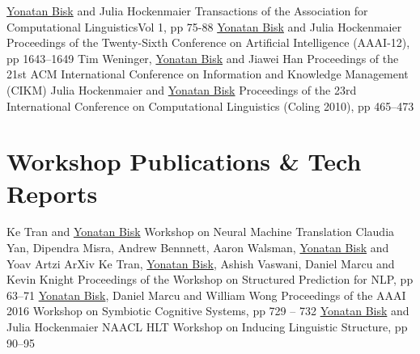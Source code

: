 \documentclass[10pt,letter]{moderncv}
\newcommand{\YB}{\underline{Yonatan Bisk}}
\begin{document}
  {\href{http://yonatanbisk.com/papers/2013-TACL.pdf}{\color{linkcolor}{An HDP Model for Inducing Combinatory Categorial Grammars}}}
  {\YB{} and Julia Hockenmaier}
  {Transactions of the Association for Computational Linguistics}{Vol 1, pp 75-88}{}
  {\href{http://yonatanbisk.com/papers/2012-AAAI.pdf}{\color{linkcolor}{Simple Robust Grammar Induction with Combinatory Categorial Grammars}}}
  {\YB{} and Julia Hockenmaier}
  {Proceedings of the Twenty-Sixth Conference on Artificial Intelligence (AAAI-12), pp 1643--1649}{}{}
\pub{--}
  {\href{http://yonatanbisk.com/papers/2012-CIKM.pdf}{\color{linkcolor}{Document-Topic Hierarchies from Document Graphs}}}
  {Tim Weninger, \YB{} and Jiawei Han}
  {Proceedings of the 21st ACM International Conference on Information and Knowledge Management (CIKM)}{}{}
  {\href{http://yonatanbisk.com/papers/2010-COLING.pdf}{\color{linkcolor}{Normal-form parsing for Combinatory Categorial Grammars with generalized composition and type-raising}}}
  {Julia Hockenmaier and \YB{}}
  {Proceedings of the 23rd International Conference on Computational Linguistics (Coling 2010), pp 465--473}{}{}


\section{Workshop Publications \& Tech Reports}
  {\href{https://arxiv.org/abs/1805.10850}{\color{linkcolor}{Inducing Grammars with and for Neural Machine Translation}}}
  {Ke Tran and \YB{}}
  {Workshop on Neural Machine Translation}{}{}
\pub{--}
  {\href{https://arxiv.org/abs/1801.07357}{\color{linkcolor}{CHALET: Cornell House Agent Learning Environment}}}
  {Claudia Yan, Dipendra Misra, Andrew Bennnett, Aaron Walsman, \YB{} and Yoav Artzi}
  {ArXiv}{}{}
  {\href{http://yonatanbisk.com/papers/2016-EMNLP-StrcPred.pdf}{\color{linkcolor}{Unsupervised Neural Hidden Markov Models}}}
  {Ke Tran, \YB{}, Ashish Vaswani, Daniel Marcu and Kevin Knight}
  {Proceedings of the Workshop on Structured Prediction for NLP, pp 63--71}{}{}
\pub{--}
  {\href{http://yonatanbisk.com/papers/2016-AAAI-Wksp.pdf}{\color{linkcolor}{Towards a Dataset for Human Computer Communication via Grounded Language Acquisition}}}
  {\YB{}, Daniel Marcu and William Wong}
  {Proceedings of the AAAI 2016 Workshop on Symbiotic Cognitive Systems, pp 729 -- 732}{}{}
  {\href{http://yonatanbisk.com/papers/2012-NAACL-WILS.pdf}{\color{linkcolor}{Induction of Linguistic Structure with Combinatory Categorial Grammars}}}
  {\YB{} and Julia Hockenmaier}
  {NAACL HLT Workshop on Inducing Linguistic Structure, pp 90--95}{}{}
\end{document}
